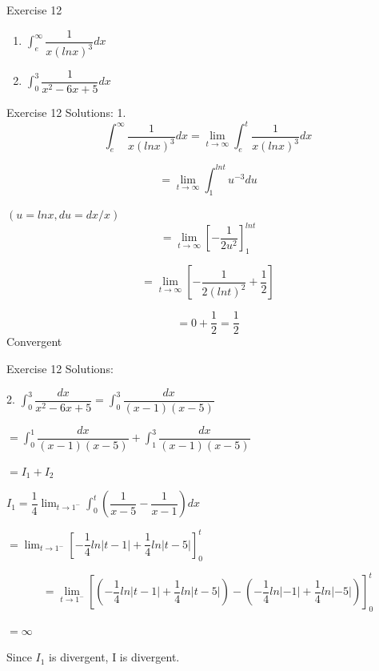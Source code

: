 \documentclass{beamer}
\begin{document}
\begin{frame}{Exercise 12}
\begin{enumerate}
    \item $\int_{e}^{\infty}\dfrac{1}{x(lnx)^3}dx$
    \item $\int_{0}^{3}\dfrac{1}{x^2 - 6x + 5}dx$
\end{enumerate}
\end{frame}

\begin{frame}{Exercise 12}
Solutions:
\small
1.
\begin{equation*}
    \int_{e}^{\infty}\dfrac{1}{x(lnx)^3}dx = \lim_{t\rightarrow \infty}\int_{e}^{t}\dfrac{1}{x(lnx)^3}dx
\end{equation*}

\begin{equation*}
    = \lim_{t \rightarrow \infty}\int_{1}^{lnt} u^{-3}du
\end{equation*}

$(u = lnx, du = dx/x)$
\begin{equation*}
    = \lim_{t\rightarrow \infty} \left[-\dfrac{1}{2u^2}\right]_1^{lnt}
\end{equation*}

\begin{equation*}
    = \lim_{t\rightarrow \infty}\left[-\dfrac{1}{2(lnt)^2} + \dfrac{1}{2}\right]
\end{equation*}

\begin{equation*}
    = 0 + \dfrac{1}{2} = \dfrac{1}{2}
\end{equation*}
Convergent
\normalsize
\end{frame}


\begin{frame}{Exercise 12}
Solutions:

2. $\int_{0}^{3}\dfrac{dx}{x^2 - 6x + 5} = \int_{0}^{3} \dfrac{dx}{(x-1)(x-5)}$

$= \int_{0}^{1}\dfrac{dx}{(x-1)(x-5)} + \int_{1}^{3}\dfrac{dx}{(x-1)(x-5)}$

$= I_1 + I_2$

$I_1 = \dfrac{1}{4}\lim_{t\rightarrow1^-}\int_0^t \left(\dfrac{1}{x-5} - \dfrac{1}{x-1}\right)dx$

$= \lim_{t\rightarrow1^-}\left[-\dfrac{1}{4}ln|t-1| + \dfrac{1}{4}ln|t-5|\right]_0^t$

\begin{equation*}
    = \lim_{t\rightarrow1^-}\left[\left(-\dfrac{1}{4}ln|t-1| + \dfrac{1}{4}ln|t-5|\right) - \left(-\dfrac{1}{4}ln|-1| + \dfrac{1}{4}ln|-5|\right)\right]_0^t
\end{equation*}

$= \infty$

Since $I_1$ is divergent, I is divergent.
\end{frame}
\end{document}
